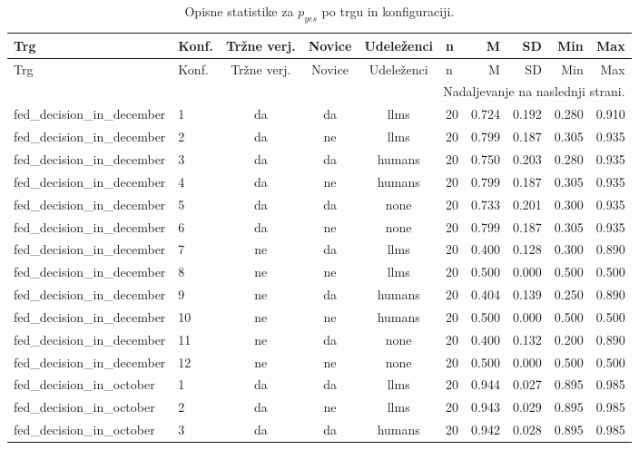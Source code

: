 \scriptsize
\setlength{\LTleft}{0pt}
\setlength{\LTright}{0pt}
\begin{longtable}{llccclrrrr}
\caption{Opisne statistike za $p_{yes}$ po trgu in konfiguraciji.}\label{tab:summary-market-config}\\
\toprule
Trg & Konf. & Tržne verj. & Novice & Udeleženci & n & M & SD & Min & Max \\
\midrule
\endfirsthead
\toprule
Trg & Konf. & Tržne verj. & Novice & Udeleženci & n & M & SD & Min & Max \\
\midrule
\endhead
\midrule
\multicolumn{10}{r}{Nadaljevanje na naslednji strani.} \\
\endfoot
\bottomrule
\endlastfoot
fed\_decision\_in\_december & 1 & da & da & llms & 20 & 0.724 & 0.192 & 0.280 & 0.910 \\
fed\_decision\_in\_december & 2 & da & ne & llms & 20 & 0.799 & 0.187 & 0.305 & 0.935 \\
fed\_decision\_in\_december & 3 & da & da & humans & 20 & 0.750 & 0.203 & 0.280 & 0.935 \\
fed\_decision\_in\_december & 4 & da & ne & humans & 20 & 0.799 & 0.187 & 0.305 & 0.935 \\
fed\_decision\_in\_december & 5 & da & da & none & 20 & 0.733 & 0.201 & 0.300 & 0.935 \\
fed\_decision\_in\_december & 6 & da & ne & none & 20 & 0.799 & 0.187 & 0.305 & 0.935 \\
fed\_decision\_in\_december & 7 & ne & da & llms & 20 & 0.400 & 0.128 & 0.300 & 0.890 \\
fed\_decision\_in\_december & 8 & ne & ne & llms & 20 & 0.500 & 0.000 & 0.500 & 0.500 \\
fed\_decision\_in\_december & 9 & ne & da & humans & 20 & 0.404 & 0.139 & 0.250 & 0.890 \\
fed\_decision\_in\_december & 10 & ne & ne & humans & 20 & 0.500 & 0.000 & 0.500 & 0.500 \\
fed\_decision\_in\_december & 11 & ne & da & none & 20 & 0.400 & 0.132 & 0.200 & 0.890 \\
fed\_decision\_in\_december & 12 & ne & ne & none & 20 & 0.500 & 0.000 & 0.500 & 0.500 \\
fed\_decision\_in\_october & 1 & da & da & llms & 20 & 0.944 & 0.027 & 0.895 & 0.985 \\
fed\_decision\_in\_october & 2 & da & ne & llms & 20 & 0.943 & 0.029 & 0.895 & 0.985 \\
fed\_decision\_in\_october & 3 & da & da & humans & 20 & 0.942 & 0.028 & 0.895 & 0.985 \\

\end{longtable}
